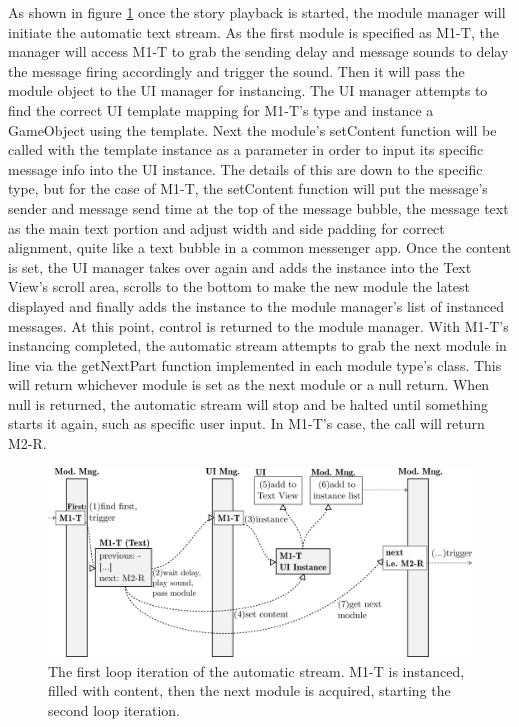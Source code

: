 As shown in figure \ref{fig:loop1} once the story playback is started, the module manager will initiate the automatic text stream. As the first module is specified as M1-T, the manager will access M1-T to grab the sending delay and message sounds to delay the message firing accordingly and trigger the sound. Then it will pass the module object to the UI manager for instancing. 
The UI manager attempts to find the correct UI template mapping for M1-T's type and instance a GameObject using the template. Next the module's setContent function will be called with the template instance as a parameter in order to input its specific message info into the UI instance. The details of this are down to the specific type, but for the case of M1-T, the setContent function will put the message's sender and message send time at the top of the message bubble, the message text as the main text portion and adjust width and side padding for correct alignment, quite like a text bubble in a common messenger app. Once the content is set, the UI manager takes over again and adds the instance into the Text View's scroll area, scrolls to the bottom to make the new module the latest displayed and finally adds the instance to the module manager's list of instanced messages.
At this point, control is returned to the module manager. With M1-T's instancing completed, the automatic stream attempts to grab the next module in line via the getNextPart function implemented in each module type's class. This will return whichever module is set as the next module or a null return. When null is returned, the automatic stream will stop and be halted until something starts it again, such as specific user input. In M1-T's case, the call will return M2-R. 

\begin{figure}[H]
\centering
\includegraphics[width=\textwidth]{figures/sampleStep1.png}
\caption[First mod. sys. loop iteration]{The first loop iteration of the automatic stream. M1-T is instanced, filled with content, then the next module is acquired, starting the second loop iteration.}\label{fig:loop1}
\end{figure}

